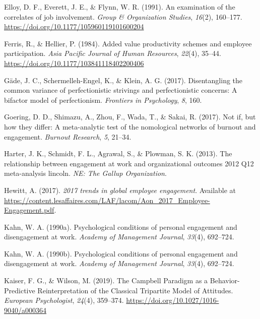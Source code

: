 \documentclass[
  man]{apa6}
\newlength{\cslhangindent}
\newlength{\cslentryspacingunit} %
\newenvironment{CSLReferences}[2] %
 {%
  \setlength{\parindent}{0pt}
  \ifodd #1
  \let\oldpar\par
  \def\par{\hangindent=\cslhangindent\oldpar}
  \fi
  \setlength{\parskip}{#2\cslentryspacingunit}
 }%
 {}
\begin{document}
\begin{CSLReferences}{1}{0}
\leavevmode{}%
Elloy, D. F., Everett, J. E., \& Flynn, W. R. (1991). An examination of the correlates of job involvement. \emph{Group \& Organization Studies}, \emph{16}(2), 160--177. \url{https://doi.org/10.1177/105960119101600204}

\leavevmode{}%
Ferris, R., \& Hellier, P. (1984). Added value productivity schemes and employee participation. \emph{Asia Pacific Journal of Human Resources}, \emph{22}(4), 35--44. \url{https://doi.org/10.1177/103841118402200406}

\leavevmode{}%
Gäde, J. C., Schermelleh-Engel, K., \& Klein, A. G. (2017). Disentangling the common variance of perfectionistic strivings and perfectionistic concerns: A bifactor model of perfectionism. \emph{Frontiers in Psychology}, \emph{8}, 160.

\leavevmode{}%
Goering, D. D., Shimazu, A., Zhou, F., Wada, T., \& Sakai, R. (2017). Not if, but how they differ: A meta-analytic test of the nomological networks of burnout and engagement. \emph{Burnout Research}, \emph{5}, 21--34.

\leavevmode{}%
Harter, J. K., Schmidt, F. L., Agrawal, S., \& Plowman, S. K. (2013). The relationship between engagement at work and organizational outcomes 2012 Q12 meta-analysis lincoln. \emph{{NE}: The Gallup Organization}.

\leavevmode{}%
Hewitt, A. (2017). \emph{2017 trends in global employee engagement}. Available at \url{https://content.lesaffaires.com/LAF/lacom/Aon_2017_Employee-Engagement.pdf}.

\leavevmode{}%
Kahn, W. A. (1990a). Psychological conditions of personal engagement and disengagement at work. \emph{Academy of Management Journal}, \emph{33}(4), 692--724.

\leavevmode{}%
Kahn, W. A. (1990b). Psychological conditions of personal engagement and disengagement at work. \emph{Academy of Management Journal}, \emph{33}(4), 692--724.

\leavevmode{}%
Kaiser, F. G., \& Wilson, M. (2019). The {Campbell} {Paradigm} as a {Behavior}-{Predictive} {Reinterpretation} of the {Classical} {Tripartite} {Model} of {Attitudes}. \emph{European Psychologist}, \emph{24}(4), 359--374. \url{https://doi.org/10.1027/1016-9040/a000364}


\end{CSLReferences}
\end{document}
